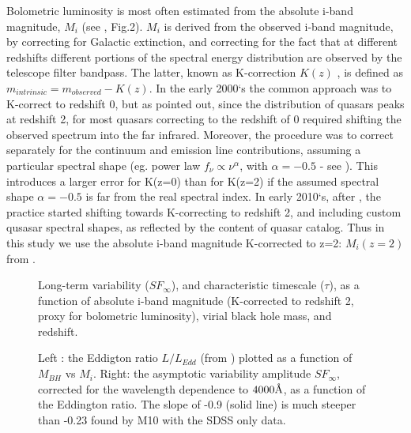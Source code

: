 \documentclass[twocolumn]{aastex62}
\let\oldAA\AA
\renewcommand{\AA}{\text{\normalfont\oldAA}}
\begin{document}
Bolometric luminosity is most often estimated from the absolute i-band magnitude, $M_{i}$ (see \citealt{shen2008}, Fig.2). $M_{i}$ is derived from the observed i-band magnitude, by correcting for Galactic extinction, and correcting for the fact that at different redshifts different portions of the spectral energy distribution are observed by the telescope filter bandpass. The latter, known as K-correction $K(z)$ \citep{oke1968},  is defined as $m_{intrinsic} = m_{observed} - K(z)$. In the early 2000`s the common approach was to K-correct to redshift 0, but as \citep{richards2006a} pointed out, since the distribution of quasars peaks at redshift 2, for most quasars correcting to the redshift of 0 required shifting the observed spectrum into the far infrared. Moreover, the procedure was to correct separately for the continuum and emission line contributions, assuming a particular spectral shape (eg. power law  $f_{\nu} \propto \nu^{\alpha}$, with $\alpha=-0.5$ - see \citealt{schneider2010, vandenberk2001, richards2006a}).  This introduces a larger error for K(z=0) than for K(z=2) if the assumed spectral shape $\alpha=-0.5$ is far from the real spectral index. In early 2010`s, after  \citealt{richards2006a, wisotzki2000, blanton2003},  the practice started shifting towards K-correcting to redshift 2,  and including custom qusasar spectral shapes, as reflected by the content of \cite{shen2011} quasar catalog. Thus in this study we use  the absolute i-band magnitude K-corrected to z=2: $M_{i}(z=2)$ from \citep{shen2011}. 






\begin{figure*}
\caption{Long-term variability ($SF_{\infty}$), and characteristic timescale ($\tau$), as a function of absolute i-band magnitude (K-corrected to redshift 2, proxy for bolometric luminosity), virial black hole mass, and redshift. }
\label{fig:sf_tau_bh_mass_luminosity}
\end{figure*} 



\begin{figure*}
\caption{Left : the Eddigton ratio $L/L_{Edd}$ (from \citealt{shen2011}) plotted as a function of $M_{BH}$  vs $M_{i}$. Right:  the asymptotic variability amplitude $SF_{\infty}$,  corrected for the wavelength dependence to $4000 \AA$, as a function of the Eddington ratio.  The slope of -0.9 (solid line) is much steeper than -0.23 found by M10 with the SDSS only data. }
\label{fig:eddington_ratio}
\end{figure*} 
\end{document}
